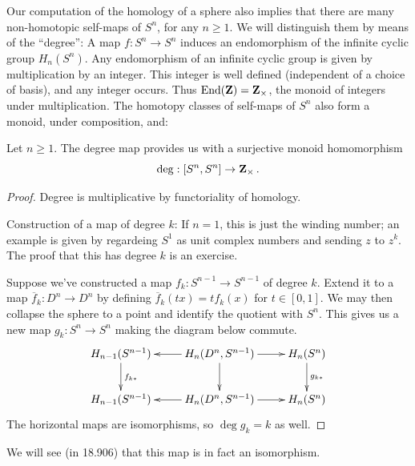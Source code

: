 Our computation of the homology of a sphere also implies that there are many non-homotopic self-maps of $S^n$, for any $n\geq1$. We will distinguish them by means of the ``degree'': A map $f:S^n\to S^n$ induces an endomorphism of the infinite cyclic group $H_n(S^n)$. Any endomorphism of an infinite cyclic group is given by multiplication by an integer. This integer is well defined (independent of a choice of basis), and any integer occurs. Thus $\mathrm{End}(\mathbf Z)=\mathbf Z_\times$, the monoid of integers under multiplication. The homotopy classes of self-maps of $S^n$ also form a monoid, under composition, and: 
\begin{theorem}
Let $n\geq 1$. The degree map provides us with a surjective monoid homomorphism
\[
\mathrm{deg}:[S^n,S^n]\to \mathbf Z_\times\,.
\]
\end{theorem}
\begin{proof}
Degree is multiplicative by functoriality of homology.

Construction of a map of degree $k$: If $n=1$, this is just the winding number; an example is given by regardeing $S^1$ as unit complex numbers and sending $z$ to $z^k$. The proof that this has degree $k$ is an exercise. 

Suppose we've constructed a map $f_k:S^{n-1}\to S^{n-1}$ of degree $k$. 
Extend it to a map $\overline f_k:D^n\to D^n$ by defining 
$\overline f_k(tx)=tf_k(x)$ for $t\in[0,1]$. We may then collapse the sphere
to a point and identify the quotient with $S^n$. This gives us a new map
$g_k:S^n\to S^n$ making the diagram below commute.
	\begin{equation*}
	\xymatrix{ H_{n-1}(S^{n-1})\ar[d]^{f_{k*}} & \ar[l] H_n(D^n,S^{n-1})\ar[r]\ar[d] & H_n(S^n) \ar[d]^{g_{k*}}\\
	 H_{n-1}(S^{n-1}) & \ar[l] H_n(D^n,S^{n-1})\ar[r] & H_n(S^n)}
	\end{equation*}
The horizontal maps are isomorphisms, so $\deg g_k=k$ as well.
\end{proof}

We will see (in 18.906) that this map is in fact an isomorphism. 

